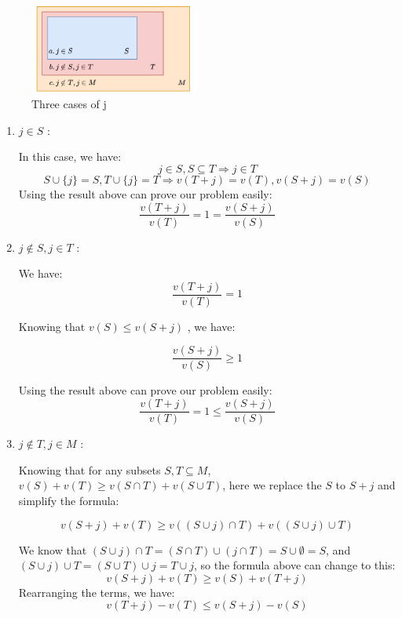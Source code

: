 \documentclass{article}
\begin{document}
\begin{enumerate}


   \begin{figure}[htbp]
      \centering
      \includegraphics[width=0.5\textwidth]{image/cases.png}
      \caption{Three cases of j}
      \label{fig:example}
    \end{figure}
   
   \begin{enumerate}
      \item $j \in S$ : 
      
      In this case, we have:
      \[
         j \in S , S \subseteq T \Rightarrow j \in T
      \]
      \[
         S \cup \{j\} = S, T \cup \{j\} = T \Rightarrow v(T+j) = v(T), v(S+j) = v(S)
      \]
      Using the result above can prove our problem easily: 
      \[
         \frac{v(T+j)}{v(T)} = 1 = \frac{v(S+j)}{v(S)}
      \]
      \item $j \notin S, j \in T$ :
      
      We have:
      \[
         \frac{v(T+j)}{v(T)} = 1
      \]

      Knowing that $ v(S) \le v(S + j) $ , we have:

      \[
         \frac{v(S+j)}{v(S)} \ge 1
      \]

      Using the result above can prove our problem easily: 
      \[
         \frac{v(T+j)}{v(T)} = 1 \le \frac{v(S+j)}{v(S)}
      \]


      \item $j \notin T, j \in M$ :
      
      Knowing that for any subsets $S, T \subseteq M$, $v(S) + v(T) \ge v(S \cap T) + v(S \cup T)$, here we replace the $S$ to $S+j$ and simplify the formula:

      \[
         v(S+j) + v(T) \ge v((S\cup j) \cap T) + v((S\cup j) \cup T)
      \]

      We know that $(S\cup j) \cap T = (S \cap T) \cup (j \cap T) = S \cup \emptyset = S$, and $(S\cup j) \cup T = (S \cup T) \cup j = T \cup j$, so the formula above can change to this:
      \[
         v(S+j) + v(T) \ge v(S) + v(T+j)
      \]
      Rearranging the terms, we have:
      \[v(T+j) - v(T) \le v(S+j) - v(S)\]


\end{enumerate}
\end{enumerate}
\end{document}
